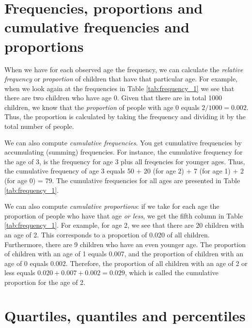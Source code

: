 \documentclass[]{book}\usepackage[]{graphicx}\usepackage[]{color}
\begin{document}
\section{Frequencies, proportions and cumulative frequencies and proportions}


When we have for each observed age the frequency, we can calculate the \textit{relative frequency} or \textit{proportion} of children that have that particular age. For example, when we look again at the frequencies in Table \ref{tab:frequency_1} we see that there are two children who have age 0. Given that there are in total 1000 children, we know that the \textit{proportion} of people with age 0 equals $2/1000=0.002$. Thus, the proportion is calculated by taking the frequency and dividing it by the total number of people.


We can also compute \textit{cumulative frequencies}. You get cumulative frequencies by accumulating (summing) frequencies. For instance, the cumulative frequency for the age of 3, is the frequency for age 3 plus all freqencies for younger ages. Thus, the cumulative frequency of age 3 equals 50 + 20 (for age 2) + 7 (for age 1) + 2 (for age 0) = 79. The cumulative frequencies for all ages are presented in Table \ref{tab:frequency_1}.

We can also compute \textit{cumulative proportions}: if we take for each age the proportion of people who have that age \textit{or less}, we get the fifth column in Table \ref{tab:frequency_1}. For example, for age 2, we see that there are 20 children with an age of 2. This corresponds to a proportion of 0.020 of all children. Furthermore, there are 9 children who have an even younger age. The proportion of children with an age of 1 equals 0.007, and the proportion of children with an age of 0 equals 0.002. Therefore, the proportion of all children with an age of 2 or less equals $0.020+0.007+0.002=0.029$, which is called the cumulative proportion for the age of 2.



\section{Quartiles, quantiles and percentiles}
\end{document}
